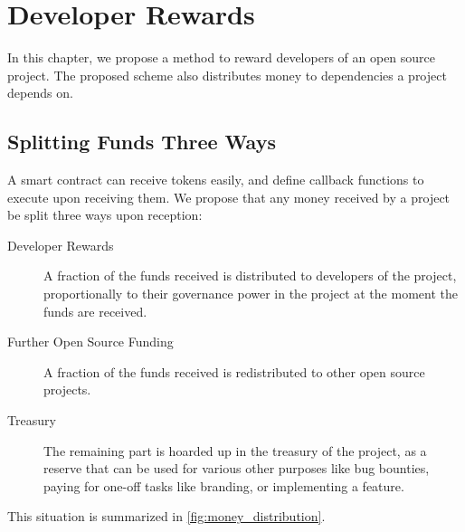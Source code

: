 \chapter{Developer Rewards}
\label{sec:dev_rewards}

In this chapter, we propose a method to reward developers of an open source project.
The proposed scheme also distributes money to dependencies a project depends on.

\section{Splitting Funds Three Ways}

A smart contract can receive tokens easily, and define callback functions to execute upon receiving them.
We propose that any money received by a project be split three ways upon reception:

\begin{description}
	\item[Developer Rewards]
	  A fraction of the funds received is distributed to developers of the project, proportionally to their governance power in the project at the moment the funds are received.
		
	\item[Further Open Source Funding]
		A fraction of the funds received is redistributed to other open source projects.

	\item[Treasury]
		The remaining part is hoarded up in the treasury of the project, as a reserve that can be used for various other purposes like bug bounties, paying for one-off tasks like branding, or implementing a feature.
\end{description}

This situation is summarized in \cref{fig:money_distribution}.

